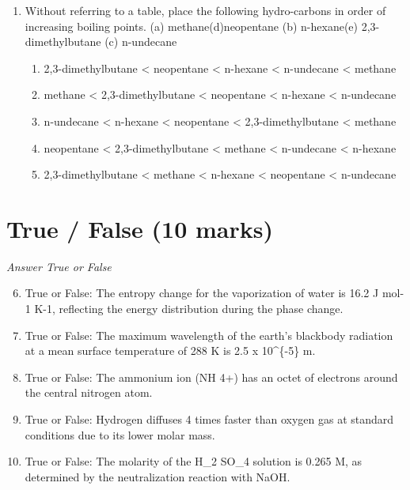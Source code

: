 \documentclass[12pt]{article}
\begin{document}
\begin{enumerate}[label=\arabic*.]
\begin{enumerate}[label=(\alph*)]
    \item 58,650.00 liters air
    \item 49,350.25 liters air
    \item 65,292.15 liters air
    \item 39,175.40 liters air
\end{enumerate}
\item Without referring to a table, place the following hydro-carbons in order of increasing boiling points. (a) methane(d)neopentane (b) n-hexane(e) 2,3-dimethylbutane (c) n-undecane
\begin{enumerate}[label=(\alph*)]
    \item 2,3-dimethylbutane \textless{} neopentane \textless{} n-hexane \textless{} n-undecane \textless{} methane
    \item methane \textless{} 2,3-dimethylbutane \textless{} neopentane \textless{} n-hexane \textless{} n-undecane
    \item n-undecane \textless{} n-hexane \textless{} neopentane \textless{} 2,3-dimethylbutane \textless{} methane
    \item neopentane \textless{} 2,3-dimethylbutane \textless{} methane \textless{} n-undecane \textless{} n-hexane
    \item 2,3-dimethylbutane \textless{} methane \textless{} n-hexane \textless{} neopentane \textless{} n-undecane
\end{enumerate}
\end{enumerate}

\section*{True / False (10 marks)}
\textit{Answer True or False}
\begin{enumerate}[label=\arabic*.]
\setcounter{enumi}{5}
\item True or False: The entropy change for the vaporization of water is 16.2 J mol-1 K-1, reflecting the energy distribution during the phase change.
\item True or False: The maximum wavelength of the earth's blackbody radiation at a mean surface temperature of 288 K is 2.5 x 10^\{-5\} m.
\item True or False: The ammonium ion (NH 4+) has an octet of electrons around the central nitrogen atom.
\item True or False: Hydrogen diffuses 4 times faster than oxygen gas at standard conditions due to its lower molar mass.
\item True or False: The molarity of the H\_2 SO\_4 solution is 0.265 M, as determined by the neutralization reaction with NaOH.
\end{enumerate}
\end{document}
